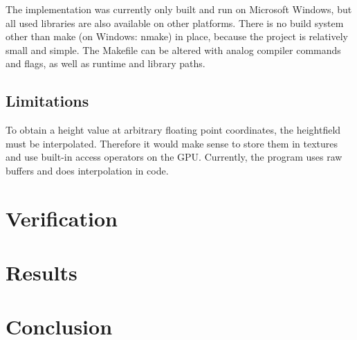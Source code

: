\documentclass[]{article}
\begin{document}
The implementation was currently only built and run on Microsoft Windows, but all used libraries are also available on other platforms. There is no build system other than make (on Windows: nmake) in place, because the project is relatively small and simple. The Makefile can be altered with analog compiler commands and flags, as well as runtime and library paths.

\subsection{Limitations}

To obtain a height value at arbitrary floating point coordinates, the heightfield must be interpolated. Therefore it would make sense to store them in textures and use built-in access operators on the GPU. Currently, the program uses raw buffers and does interpolation in code.

\section{Verification}

\section{Results}

\section{Conclusion}


\end{document}
